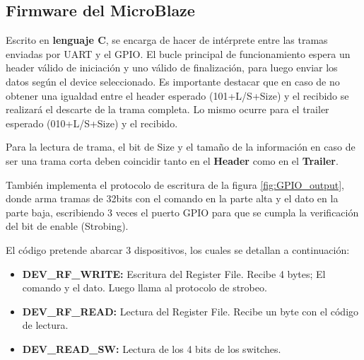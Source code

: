 \documentclass[12pt, a4paper]{article}
\begin{document}
    \subsection{Firmware del MicroBlaze}
        Escrito en \textbf{lenguaje C}, se encarga de hacer de intérprete entre las tramas enviadas por UART y el GPIO.
        El bucle principal de funcionamiento espera un header válido de iniciación y uno válido de finalización, para luego enviar los datos según el device seleccionado. Es importante destacar que
        en caso de no obtener una igualdad entre el header esperado (101+L/S+Size) y el recibido se realizará el descarte de la trama completa. Lo mismo ocurre para el trailer esperado (010+L/S+Size) y el recibido.

        Para la lectura de trama, el bit de Size y el tamaño de la información en caso de ser una trama corta deben coincidir tanto en el \textbf{Header} como en el \textbf{Trailer}.

        También implementa el protocolo de escritura de la figura \ref{fig:GPIO_output}, donde arma tramas de 32bits con el comando en la parte alta y el dato en la parte baja, escribiendo 3 veces el puerto GPIO para que
        se cumpla la verificación del bit de enable (Strobing).

        El código pretende abarcar 3 dispositivos, los cuales se detallan a continuación:
        \begin{itemize}
            \item \textbf{DEV\_RF\_WRITE:} Escritura del Register File. Recibe 4 bytes; El comando y el dato. Luego llama al protocolo de strobeo.
            \item \textbf{DEV\_RF\_READ:} Lectura del Register File. Recibe un byte con el código de lectura.
            \item \textbf{DEV\_READ\_SW:} Lectura de los 4 bits de los switches.
        \end{itemize}
\end{document}
